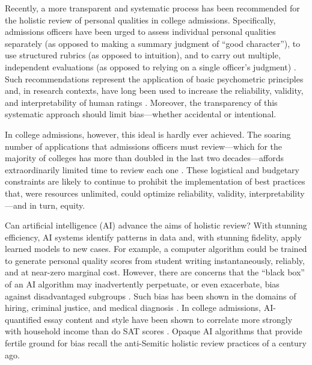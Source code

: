 \documentclass[11pt]{report}
\begin{document}
\begin{mainf}
Recently, a more transparent and systematic process has been recommended for the holistic review of personal qualities in college admissions. Specifically, admissions officers have been urged to assess individual personal qualities separately (as opposed to making a summary judgment of “good character”), to use structured rubrics (as opposed to intuition), and to carry out multiple, independent evaluations (as opposed to relying on a single officer’s judgment) \cite{coleman_understanding_2018,anderson_character_2020}. Such recommendations represent the application of basic psychometric principles and, in research contexts, have long been used to increase the reliability, validity, and interpretability of human ratings \cite{kahneman_noise_2021,rushton_behavioral_1983}. Moreover, the transparency of this systematic approach should limit bias—whether accidental or intentional. 

In college admissions, however, this ideal is hardly ever achieved. The soaring number of applications that admissions officers must review—which for the majority of colleges has more than doubled in the last two decades—affords extraordinarily limited time to review each one \cite{hoover_working_2017,korn_elite_2018}. These logistical and budgetary constraints are likely to continue to prohibit the implementation of best practices that, were resources unlimited, could optimize reliability, validity, interpretability—and in turn, equity.

Can artificial intelligence (AI) advance the aims of holistic review? With stunning efficiency, AI systems identify patterns in data and, with stunning fidelity, apply learned models to new cases. For example, a computer algorithm could be trained to generate personal quality scores from student writing instantaneously, reliably, and at near-zero marginal cost. However, there are concerns that the “black box” of an AI algorithm may inadvertently perpetuate, or even exacerbate, bias against disadvantaged subgroups \cite{tay_conceptual_2022,hickman_automated_2022}. Such bias has been shown in the domains of hiring, criminal justice, and medical diagnosis \cite{manyika_what_2019, obermeyer_dissecting_2019, ensign_runaway_2018}. In college admissions, AI-quantified essay content and style have been shown to correlate more strongly with household income than do SAT scores \cite{alvero_essay_2021}. Opaque AI algorithms that provide fertile ground for bias recall the anti-Semitic holistic review practices of a century ago. %


\end{mainf}
\end{document}
